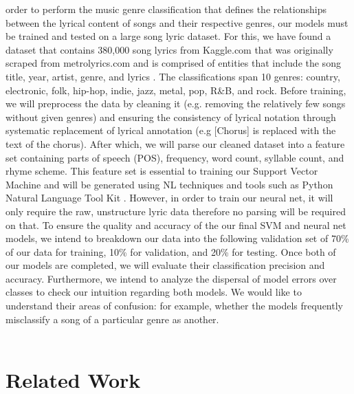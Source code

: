 \documentclass[journal]{IEEEtran}
\begin{document}
     order to perform the music genre classification that defines the relationships between the lyrical content of songs and their respective genres, our models must be trained and tested on a large song lyric dataset. For this, we have found a dataset that contains 380,000 song lyrics from Kaggle.com that was originally scraped from metrolyrics.com and is comprised of entities that include the song title, year, artist, genre, and lyrics  \cite{KaggleDataset}. The classifications span 10 genres: country, electronic, folk, hip-hop, indie, jazz, metal, pop, R\&B, and rock. Before training, we will preprocess the data by cleaning it (e.g. removing the relatively few songs without given genres) and ensuring the consistency of lyrical notation through systematic replacement of lyrical annotation (e.g [Chorus] is replaced with the text of the chorus). After which, we will parse our cleaned dataset into a feature set containing parts of speech (POS), frequency, word count, syllable count, and rhyme scheme. This feature set is essential to training our Support Vector Machine and will be generated using NL techniques and tools such as Python Natural Language Tool Kit \cite{NLTK}. However, in order to train our neural net, it will only require the raw, unstructure lyric data therefore no parsing will be required on that. To ensure the quality and accuracy of the our final SVM and neural net models, we intend to breakdown our data into the following validation set of 70\% of our data for training, 10\% for validation, and 20\% for testing. Once both of our models are completed, we will evaluate their classification precision and accuracy. Furthermore, we intend to analyze the dispersal of model errors over classes to check our intuition regarding both models. We would like to understand their areas of confusion: for example, whether the models frequently misclassify a song of a particular genre as another. \\ \\ \par



\section{Related Work}
\end{document}
